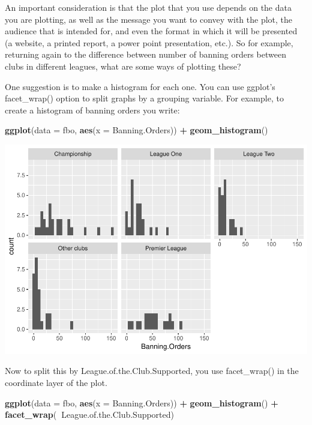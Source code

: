\documentclass[]{book}
\newenvironment{Shaded}{\begin{snugshade}}{\end{snugshade}}
\newcommand{\DataTypeTok}[1]{\textcolor[rgb]{0.13,0.29,0.53}{#1}}
\newcommand{\KeywordTok}[1]{\textcolor[rgb]{0.13,0.29,0.53}{\textbf{#1}}}
\newcommand{\NormalTok}[1]{#1}
\newcommand{\OperatorTok}[1]{\textcolor[rgb]{0.81,0.36,0.00}{\textbf{#1}}}
\newcommand{\StringTok}[1]{\textcolor[rgb]{0.31,0.60,0.02}{#1}}
\theoremstyle{definition}
\theoremstyle{definition}
\theoremstyle{definition}
\theoremstyle{remark}
\begin{document}
An important consideration is that the plot that you use depends on the
data you are plotting, as well as the message you want to convey with
the plot, the audience that is intended for, and even the format in
which it will be presented (a website, a printed report, a power point
presentation, etc.). So for example, returning again to the difference
between number of banning orders between clubs in different leagues,
what are some ways of plotting these?

One suggestion is to make a histogram for each one. You can use ggplot's
facet\_wrap() option to split graphs by a grouping variable. For
example, to create a histogram of banning orders you write:

\begin{Shaded}
\begin{Highlighting}[]
\KeywordTok{ggplot}\NormalTok{(}\DataTypeTok{data =}\NormalTok{ fbo, }\KeywordTok{aes}\NormalTok{(}\DataTypeTok{x =}\NormalTok{ Banning.Orders)) }\OperatorTok{+}\StringTok{ }
\StringTok{  }\KeywordTok{geom_histogram}\NormalTok{()}
\end{Highlighting}
\end{Shaded}

\includegraphics{03-visualisation_files/figure-latex/unnamed-chunk-10-1.pdf}

Now to split this by League.of.the.Club.Supported, you use facet\_wrap()
in the coordinate layer of the plot.

\begin{Shaded}
\begin{Highlighting}[]
\KeywordTok{ggplot}\NormalTok{(}\DataTypeTok{data =}\NormalTok{ fbo, }\KeywordTok{aes}\NormalTok{(}\DataTypeTok{x =}\NormalTok{ Banning.Orders)) }\OperatorTok{+}\StringTok{ }
\StringTok{  }\KeywordTok{geom_histogram}\NormalTok{() }\OperatorTok{+}\StringTok{ }
\StringTok{  }\KeywordTok{facet_wrap}\NormalTok{(}\OperatorTok{~}\NormalTok{League.of.the.Club.Supported)}
\end{Highlighting}
\end{Shaded}
\end{document}
